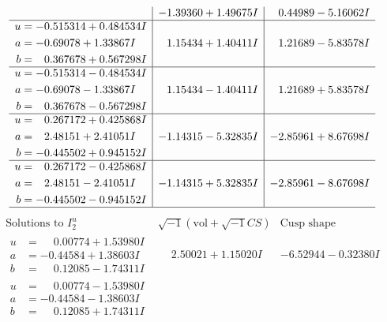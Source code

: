 \documentclass[1p]{elsarticle_modified}
\theoremstyle{definition}
\newcommand{\I}{\sqrt{-1}}
\begin{document}
$$\begin{array}{c|c|c}
 & -1.39360 + 1.49675 I & \phantom{-}0.44989 - 5.16062 I \\ \hline\begin{aligned}
u &= -0.515314 + 0.484534 I \\
a &= -0.69078 + 1.33867 I \\
b &= \phantom{-}0.367678 + 0.567298 I\end{aligned}
 & \phantom{-}1.15434 + 1.40411 I & \phantom{-}1.21689 - 5.83578 I \\ \hline\begin{aligned}
u &= -0.515314 - 0.484534 I \\
a &= -0.69078 - 1.33867 I \\
b &= \phantom{-}0.367678 - 0.567298 I\end{aligned}
 & \phantom{-}1.15434 - 1.40411 I & \phantom{-}1.21689 + 5.83578 I \\ \hline\begin{aligned}
u &= \phantom{-}0.267172 + 0.425868 I \\
a &= \phantom{-}2.48151 + 2.41051 I \\
b &= -0.445502 + 0.945152 I\end{aligned}
 & -1.14315 - 5.32835 I & -2.85961 + 8.67698 I \\ \hline\begin{aligned}
u &= \phantom{-}0.267172 - 0.425868 I \\
a &= \phantom{-}2.48151 - 2.41051 I \\
b &= -0.445502 - 0.945152 I\end{aligned}
 & -1.14315 + 5.32835 I & -2.85961 - 8.67698 I\\
 \hline 
 \end{array}$$\newpage$$\begin{array}{c|c|c}  
\text{Solutions to }I^u_{2}& \I (\text{vol} + \sqrt{-1}CS) & \text{Cusp shape}\\
 \hline 
\begin{aligned}
u &= \phantom{-}0.00774 + 1.53980 I \\
a &= -0.44584 + 1.38603 I \\
b &= \phantom{-}0.12085 - 1.74311 I\end{aligned}
 & \phantom{-}2.50021 + 1.15020 I & -6.52944 - 0.32380 I \\ \hline\begin{aligned}
u &= \phantom{-}0.00774 - 1.53980 I \\
a &= -0.44584 - 1.38603 I \\
b &= \phantom{-}0.12085 + 1.74311 I\end{aligned}

\end{array}$$
\end{document}
